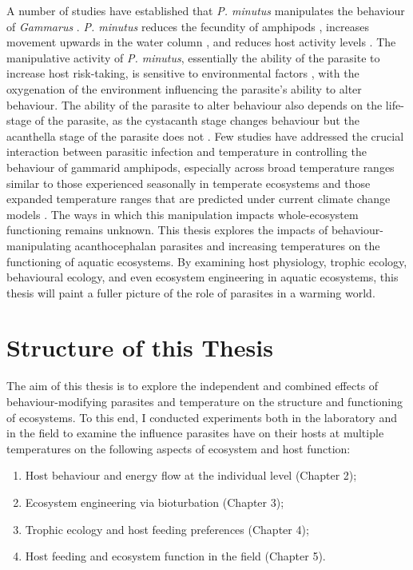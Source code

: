 A number of studies have established that \emph{P. minutus} manipulates the behaviour of \emph{Gammarus} \citep{kaldonski2008, perrot2016}. \emph{P. minutus} reduces the fecundity of amphipods \citep{dezfuli1999}, increases movement upwards in the water column \citep{perrot2016}, and reduces host activity levels \citep{jacquin2014}. The manipulative activity of \emph{P. minutus}, essentially the ability of the parasite to increase host risk-taking, is sensitive to environmental factors \citep{perrot2016}, with the oxygenation of the environment influencing the parasite’s ability to alter behaviour. The ability of the parasite to alter behaviour also depends on the life-stage of the parasite, as the cystacanth stage changes behaviour but the acanthella stage of the parasite does not \citep{bailly2017}. Few studies have addressed the crucial interaction between parasitic infection and temperature in controlling the behaviour of gammarid amphipods, especially across broad temperature ranges similar to those experienced seasonally in temperate ecosystems and those expanded temperature ranges that are predicted under current climate change models \citep{labaude2016, labaude2017}. The ways in which this manipulation impacts whole-ecosystem functioning remains unknown. This thesis explores the impacts of behaviour-manipulating acanthocephalan parasites and increasing temperatures on the functioning of aquatic ecosystems. By examining host physiology, trophic ecology, behavioural ecology, and even ecosystem engineering in aquatic ecosystems, this thesis will paint a fuller picture of the role of parasites in a warming world. 

\section{Structure of this Thesis}

The aim of this thesis is to explore the independent and combined effects of behaviour-modifying parasites and temperature on the structure and functioning of ecosystems. To this end, I conducted experiments both in the laboratory and in the field to examine the influence parasites have on their hosts at multiple temperatures on the following aspects of ecosystem and host function: 

\begin{enumerate}
\item	Host behaviour and energy flow at the individual level (Chapter 2); 
\item	Ecosystem engineering via bioturbation  (Chapter 3); 
\item	Trophic ecology and host feeding preferences  (Chapter 4); 
\item	Host feeding and ecosystem function in the field (Chapter 5).
\end{enumerate}

